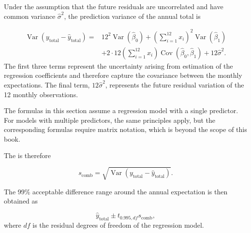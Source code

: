 Under the assumption that the future residuals are uncorrelated and have common variance $\hat{\sigma}^2$, the prediction variance of the annual total is

\begin{equation}
\label{eq:annual_prediction_variance}
\begin{split}
\operatorname{Var}
\left(
y_{\text{total}} - \hat{y}_{\text{total}}
\right)
={}&
12^2\operatorname{Var}(\hat{\beta}_0)
+
\left(
\sum_{i=1}^{12} x_i
\right)^2
\operatorname{Var}(\hat{\beta}_1) \\
&+
2 \cdot 12
\left(
\sum_{i=1}^{12} x_i
\right)
\operatorname{Cov}(\hat{\beta}_0,\hat{\beta}_1)
+
12\hat{\sigma}^2.
\end{split}
\end{equation}
The first three terms represent the uncertainty arising from estimation of the regression coefficients and therefore capture the covariance between the monthly expectations. The final term, \(12\hat{\sigma}^2\), represents the future residual variation of the 12 monthly observations.

The formulas in this section assume a regression model with a single predictor. For models with multiple predictors, the same principles apply, but the corresponding formulas require matrix notation, which is beyond the scope of this book.

\medskip
The  is therefore

\begin{equation}
\label{eq:combined_prediction_standard_error}
s_{\text{comb}}
=
\sqrt{
\operatorname{Var}
\left(
y_{\text{total}}-\hat{y}_{\text{total}}
\right)
}.
\end{equation}


The 99\% acceptable difference range around the annual expectation is then obtained as

\begin{equation}
\label{eq:annual_prediction_interval}
\hat{y}_{\text{total}}
\pm
t_{0.995,df}
s_{\text{comb}},
\end{equation}
where $df$ is the residual degrees of freedom of the regression model.


